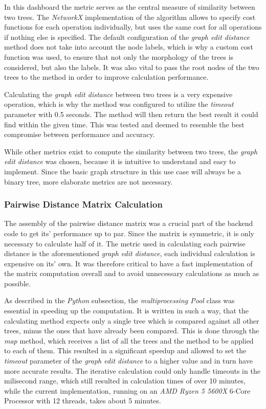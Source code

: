 \documentclass[a4paper, 12pt]{article}
\begin{document}
In this dashboard the metric serves as the central measure of similarity between two trees. The
\textit{NetworkX} implementation of the algorithm allows to specify cost functions for each
operation individually, but uses the same cost for all operations if nothing else is specified.
The default configuration of the \textit{graph edit distance} method does not take into account
the node labels, which is why a custom cost function was used, to ensure that not only the
morphology of the trees is considered, but also the labels. It was also vital to pass the root
nodes of the two trees to the method in order to improve calculation performance. \par

Calculating the \textit{graph edit distance} between two trees is a very expensive operation,
which is why the method was configured to utilize the \textit{timeout} parameter with 0.5 seconds.
The method will then return the best result it could find within the given time. This was tested
and deemed to resemble the best compromise between performance and accuracy. \par

While other metrics exist to compute the similarity between two trees, the \textit{graph edit
    distance} was chosen, because it is intuitive to understand and easy to implement. Since the
basic graph structure in this use case will always be a binary tree, more elaborate metrics
are not necessary.

\subsubsection{Pairwise Distance Matrix Calculation}
The assembly of the pairwise distance matrix was a crucial part of the backend code to get its'
performance up to par. Since the matrix is symmetric, it is only necessary to calculate half of
it. The metric used in calculating each pairwise distance is the aforementioned \textit{graph
    edit distance}, each individual calculation is expensive on its' own. It was therefore critical
to have a fast implementation of the matrix computation overall and to avoid unnecessary
calculations as much as possible. \par

As described in the \textit{Python} subsection, the \textit{multiprocessing Pool} class was
essential in speeding up the computation. It is written in such a way, that the calculating method
expects only a single tree which is compared against all other trees, minus the ones that
have already been compared. This is done through the \textit{map} method, which receives a list
of all the trees and the method to be applied to each of them. This resulted in a significant
speedup and allowed to set the \textit{timeout} parameter of the \textit{graph edit distance}
to a higher value and in turn have more accurate results. The iterative calculation could only
handle timeouts in the milisecond range, which still resulted in calculation times of over 10
minutes, while the current implementation, running on an \textit{AMD Ryzen 5 5600X} 6-Core
Processor with 12 threads, takes about 5 minutes. \par
\end{document}
